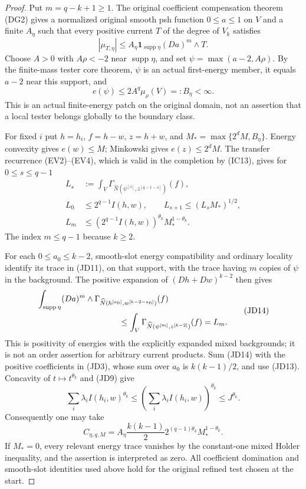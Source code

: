 \documentclass[11pt,a4paper]{article}
\numberwithin{equation}{section}
\theoremstyle{definition}
\theoremstyle{remark}
\begin{document}
\begin{proof}
Put $m=q-k+1\geq1$.  The original coefficient compensation theorem
(DG2) gives a normalized original smooth psh function $0\leq a\leq1$
on $V$ and a finite $A_\eta$ such that every positive current $T$
of the degree of $V_k$ satisfies
\[
 |\mu_{T,\eta}|
   \leq A_\eta\mathbf1_{\operatorname{supp}\eta}(Da)^m\wedge T.
 \tag{JD11}
\]
Choose $A>0$ with $A\rho<-2$ near $\operatorname{supp}\eta$, and set
$\psi=\max(a-2,A\rho)$.  By the finite-mass tester core theorem,
$\psi$ is an actual first-energy member, it equals $a-2$ near this
support, and
\[
               e(\psi)\leq 2A^q\mu_\rho(V)=:B_\eta<\infty.
 \tag{JD12}
\]
This is an actual finite-energy patch on the original domain, not
an assertion that a local tester belongs globally to the boundary class.

For fixed $i$ put $h=h_i$, $f=h-w$, $z=h+w$, and
$M_* =\max\{2^dM,B_\eta\}$.  Energy convexity gives $e(w)\leq M$;
Minkowski gives $e(z)\leq2^dM$.  The transfer recurrence (EV2)--(EV4),
which is valid in the completion by (IC13), gives for $0\leq s\leq q-1$
\[
 \begin{split}
 L_s&:=\int_V\Gamma_{\widehat N(\psi^{[s]},z^{[q-1-s]})}(f),\\
 L_0&\leq2^{q-1}I(h,w),\qquad
 L_{s+1}\leq(L_sM_*)^{1/2},\\
 L_m&\leq (2^{q-1}I(h,w))^{\theta_k}M_*^{1-\theta_k}.
 \end{split}
 \tag{JD13}
\]
The index $m\leq q-1$ because $k\geq2$.

For each $0\leq a_0\leq k-2$, smooth-slot energy compatibility
and ordinary locality identify its trace in (JD11), on that support,
with the trace having $m$ copies of $\psi$ in the background.
The positive expansion of $(Dh+Dw)^{k-2}$ then gives
\[
 \begin{split}
 &\int_{\operatorname{supp}\eta}(Da)^m\wedge
        \Gamma_{\widehat N(h^{[a_0]},w^{[k-2-a_0]})}(f)\\
 &\hspace{35mm}\leq
       \int_V\Gamma_{\widehat N(\psi^{[m]},z^{[k-2]})}(f)=L_m.
 \end{split}
 \tag{JD14}
\]
This is positivity of energies with the explicitly expanded mixed
backgrounds; it is not an order assertion for arbitrary current products.
Sum (JD14) with the positive coefficients in (JD3), whose sum over
$a_0$ is $k(k-1)/2$, and use (JD13).  Concavity of
$t\mapsto t^{\theta_k}$ and (JD9) give
\[
 \sum_i\lambda_i I(h_i,w)^{\theta_k}
       \leq\left(\sum_i\lambda_i I(h_i,w)\right)^{\theta_k}
       \leq J^{\theta_k}.
\]
Consequently one may take
\[
 C_{\eta,q,M}=A_\eta\frac{k(k-1)}2
                2^{(q-1)\theta_k}M_*^{1-\theta_k}.
 \tag{JD15}
\]
If $M_*=0$, every relevant energy trace vanishes by the
constant-one mixed Holder inequality, and the assertion is interpreted
as zero.  All coefficient domination and smooth-slot identities used
above hold for the original refined test chosen at the start.
\end{proof}
\end{document}
